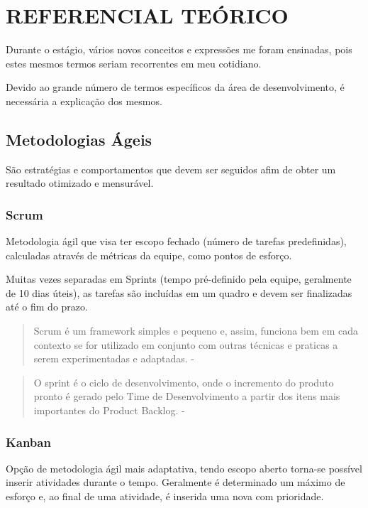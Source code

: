 \chapter{REFERENCIAL TEÓRICO}
\label{cap:elementos}

Durante o estágio, vários novos conceitos e expressões me foram ensinadas, pois estes mesmos termos seriam recorrentes em meu cotidiano.

Devido ao grande número de termos específicos da área de desenvolvimento, é necessária a explicação dos mesmos.

\section{Metodologias Ágeis}

São estratégias e comportamentos que devem ser seguidos afim de obter um resultado otimizado e mensurável.

\subsection{Scrum}

Metodologia ágil que visa ter escopo fechado (número de tarefas predefinidas), calculadas através de métricas da equipe, como pontos de esforço.

Muitas vezes separadas em Sprints (tempo pré-definido pela equipe, geralmente de 10 dias úteis), as tarefas são incluídas em um quadro e devem ser finalizadas até o fim do prazo.
\begin{quote}
  Scrum é um framework simples e pequeno e, assim, funciona bem em  cada contexto se for utilizado em conjunto com outras técnicas e praticas a serem experimentadas e adaptadas. - \cite{sabbagh2014scrum}
\end{quote}
\begin{quote}
  O sprint é o ciclo de desenvolvimento, onde o incremento do produto pronto é gerado pelo Time de Desenvolvimento a partir dos itens mais importantes do Product Backlog. - \cite{sabbagh2014scrum}
\end{quote}

\subsection{Kanban}
  Opção de metodologia ágil mais adaptativa, tendo escopo aberto torna-se possível inserir atividades durante o tempo.
  Geralmente é determinado um máximo de esforço e, ao final de uma atividade, é inserida uma nova com prioridade.

